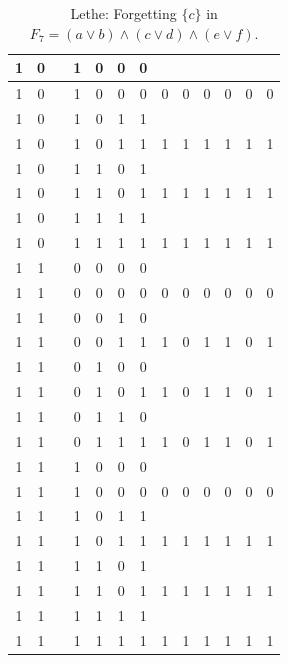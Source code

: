 \begin{table}[!tb]
\begin{tabular}{|c|c|c|c|c|c|c|c|c|c|c|c|c|}
        \rowcolor{gray!40} 1 & 0 &  & 1 & 0 & 0 & 0 &  &  &  &  &  &  \\ \hline
        \rowcolor{gray!40} 1 & 0 &  & 1 & 0 & 0 & 0 & 0 & 0 & 0 & 0 & 0 & 0 \\ \hline
        \rowcolor{blue!40} 1 & 0 &  & 1 & 0 & 1 & 1 &  &  &  &  &  &  \\ \hline
        \rowcolor{blue!40} 1 & 0 &  & 1 & 0 & 1 & 1 & 1 & 1 & 1 & 1 & 1 & 1 \\ \hline
        \rowcolor{red!40} 1 & 0 &  & 1 & 1 & 0 & 1 &  &  &  &  &  &  \\ \hline
        \rowcolor{red!40} 1 & 0 &  & 1 & 1 & 0 & 1 & 1 & 1 & 1 & 1 & 1 & 1 \\ \hline
        \rowcolor{green!40} 1 & 0 &  & 1 & 1 & 1 & 1 &  &  &  &  &  &  \\ \hline
        \rowcolor{green!40} 1 & 0 &  & 1 & 1 & 1 & 1 & 1 & 1 & 1 & 1 & 1 & 1 \\ \hline
        \rowcolor{yellow!40} 1 & 1 &  & 0 & 0 & 0 & 0 &  &  &  &  &  &  \\ \hline
        \rowcolor{yellow!40} 1 & 1 &  & 0 & 0 & 0 & 0 & 0 & 0 & 0 & 0 & 0 & 0 \\ \hline
        \rowcolor{gray!40} 1 & 1 &  & 0 & 0 & 1 & 0 &  &  &  &  &  &  \\ \hline
        \rowcolor{gray!40} 1 & 1 &  & 0 & 0 & 1 & 1 & 1 & 0 & 1 & 1 & 0 & 1 \\ \hline
        \rowcolor{blue!40} 1 & 1 &  & 0 & 1 & 0 & 0 &  &  &  &  &  &  \\ \hline
        \rowcolor{blue!40} 1 & 1 &  & 0 & 1 & 0 & 1 & 1 & 0 & 1 & 1 & 0 & 1 \\ \hline
        \rowcolor{red!40} 1 & 1 &  & 0 & 1 & 1 & 0 &  &  &  &  &  &  \\ \hline
        \rowcolor{red!40} 1 & 1 &  & 0 & 1 & 1 & 1 & 1 & 0 & 1 & 1 & 0 & 1 \\ \hline
        \rowcolor{green!40} 1 & 1 &  & 1 & 0 & 0 & 0 &  &  &  &  &  &  \\ \hline
        \rowcolor{green!40} 1 & 1 &  & 1 & 0 & 0 & 0 & 0 & 0 & 0 & 0 & 0 & 0 \\ \hline
        \rowcolor{yellow!40} 1 & 1 &  & 1 & 0 & 1 & 1 &  &  &  &  &  &  \\ \hline
        \rowcolor{yellow!40} 1 & 1 &  & 1 & 0 & 1 & 1 & 1 & 1 & 1 & 1 & 1 & 1 \\ \hline
        \rowcolor{gray!40} 1 & 1 &  & 1 & 1 & 0 & 1 &  &  &  &  &  &  \\ \hline
        \rowcolor{gray!40} 1 & 1 &  & 1 & 1 & 0 & 1 & 1 & 1 & 1 & 1 & 1 & 1 \\ \hline
        \rowcolor{blue!40} 1 & 1 &  & 1 & 1 & 1 & 1 &  &  &  &  &  &  \\ \hline
        \rowcolor{blue!40} 1 & 1 &  & 1 & 1 & 1 & 1 & 1 & 1 & 1 & 1 & 1 & 1 \\ \hline
    \end{tabular}
    \caption{Lethe: Forgetting $\{c\}$ in $F_{7} = (a \lor b) \land (c \lor d) \land (e \lor f)$.}
    \label{tab:lethe-F7-c}
\end{table}
